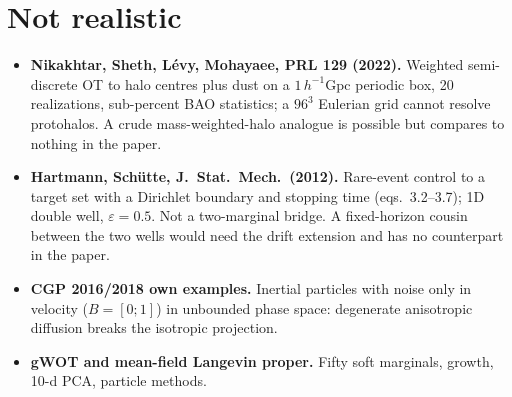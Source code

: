 \documentclass[11pt]{article}
\newcommand{\eps}{\varepsilon}
\begin{document}
\section{Not realistic}
\label{sec:no}
\begin{itemize}
  \item \textbf{Nikakhtar, Sheth, L\'evy, Mohayaee, PRL 129 (2022).} Weighted semi-discrete OT to halo centres plus dust on a $1\,h^{-1}$Gpc periodic box, 20 realizations, sub-percent BAO statistics; a $96^3$ Eulerian grid cannot resolve protohalos. A crude mass-weighted-halo analogue is possible but compares to nothing in the paper.
  \item \textbf{Hartmann, Sch\"utte, J.\ Stat.\ Mech.\ (2012).} Rare-event control to a target set with a Dirichlet boundary and stopping time (eqs.~3.2--3.7); 1D double well, $\eps=0.5$. Not a two-marginal bridge. A fixed-horizon cousin between the two wells would need the drift extension and has no counterpart in the paper.
  \item \textbf{CGP 2016/2018 own examples.} Inertial particles with noise only in velocity ($B=[0;1]$) in unbounded phase space: degenerate anisotropic diffusion breaks the isotropic projection.
  \item \textbf{gWOT and mean-field Langevin proper.} Fifty soft marginals, growth, 10-d PCA, particle methods.
\end{itemize}
\end{document}
